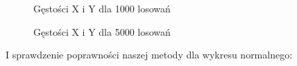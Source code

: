 \documentclass{article}
\begin{document}
\begin{enumerate}
\begin{figure}[h]
\begin{center}
{				}
				\caption{Gęstości X i Y dla 1000 losowań}
			\end{center}
		\end{figure}
		\begin{figure}[h]
			\begin{center}
				\caption{Gęstości X i Y dla 5000 losowań}
			\end{center}
		\end{figure}
		I sprawdzenie poprawności naszej metody dla wykresu normalnego:
		\begin{figure}[h]
			\begin{center}
\end{center}
\end{figure}
\end{enumerate}
\end{document}
